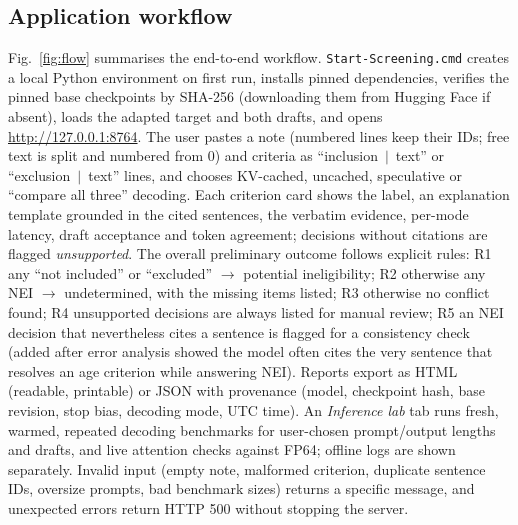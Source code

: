\subsection{Application workflow}\label{sec:app}
Fig.~\ref{fig:flow} summarises the end-to-end workflow. \texttt{Start-Screening.cmd} creates a local Python environment on first run, installs pinned dependencies, verifies the pinned base checkpoints by SHA-256 (downloading them from Hugging Face if absent), loads the adapted target and both drafts, and opens \url{http://127.0.0.1:8764}. The user pastes a note (numbered lines keep their IDs; free text is split and numbered from 0) and criteria as ``inclusion~$|$~text'' or ``exclusion~$|$~text'' lines, and chooses KV-cached, uncached, speculative or ``compare all three'' decoding. Each criterion card shows the label, an explanation template grounded in the cited sentences, the verbatim evidence, per-mode latency, draft acceptance and token agreement; decisions without citations are flagged \emph{unsupported}. The overall preliminary outcome follows explicit rules: R1 any ``not included'' or ``excluded'' $\rightarrow$ potential ineligibility; R2 otherwise any NEI $\rightarrow$ undetermined, with the missing items listed; R3 otherwise no conflict found; R4 unsupported decisions are always listed for manual review; R5 an NEI decision that nevertheless cites a sentence is flagged for a consistency check (added after error analysis showed the model often cites the very sentence that resolves an age criterion while answering NEI). Reports export as HTML (readable, printable) or JSON with provenance (model, checkpoint hash, base revision, stop bias, decoding mode, UTC time). An \emph{Inference lab} tab runs fresh, warmed, repeated decoding benchmarks for user-chosen prompt/output lengths and drafts, and live attention checks against FP64; offline logs are shown separately. Invalid input (empty note, malformed criterion, duplicate sentence IDs, oversize prompts, bad benchmark sizes) returns a specific message, and unexpected errors return HTTP 500 without stopping the server.

